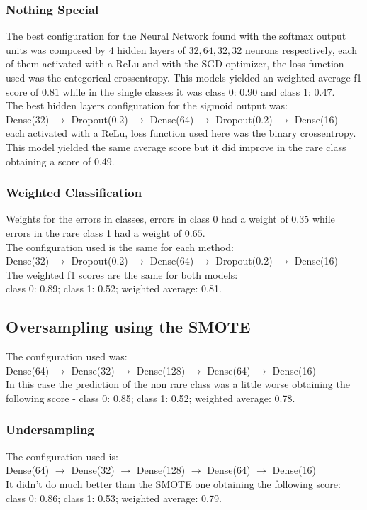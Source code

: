\documentclass[12pt, twocolumn]{article}
\begin{document}
\subsubsection*{Nothing Special}
The best configuration for the Neural Network found with the softmax output units was composed by 4 hidden layers of $32,64,32,32$ neurons respectively, each of them activated with a ReLu and with the SGD optimizer, the loss function used was the categorical crossentropy. This models yielded an weighted average f1 score of $0.81$ while in the single classes it was class 0: 0.90 and class 1: 0.47.\\
The best hidden layers configuration for the sigmoid output was: \\
Dense(32) $\to$ Dropout(0.2) $\to$ Dense(64) $\to$ Dropout(0.2) $\to$ Dense(16)\\
each activated with a ReLu, loss function used here was the binary crossentropy.
This model yielded the same average score but it did improve in the rare class obtaining a score of 0.49.
\vspace{-0.5cm}
\subsubsection*{Weighted Classification}
Weights for the errors in classes, errors in class 0 had a weight of $0.35$ while errors in the rare class 1 had a weight of $0.65$.\\
The configuration used is the same for each method:\\
Dense(32) $\to$ Dropout(0.2) $\to$ Dense(64) $\to$ Dropout(0.2) $\to$ Dense(16)\\
The weighted f1 scores are the same for both models:\\
class 0: 0.89; class 1: 0.52; weighted average: 0.81.
\vspace{-0.5cm}
\subsection*{Oversampling using the SMOTE}
The configuration used was:\\
Dense(64) $\to$ Dense(32) $\to$ Dense(128) $\to$ Dense(64) $\to$ Dense(16)\\
In this case the prediction of the non rare class was a little worse obtaining the following score - 
class 0: 0.85; class 1: 0.52; weighted average: 0.78.
\vspace{-0.5cm}
\subsubsection*{Undersampling}
The configuration used is:\\
Dense(64) $\to$ Dense(32) $\to$ Dense(128) $\to$ Dense(64) $\to$ Dense(16)\\
It didn't do much better than the SMOTE one obtaining the following score:\\
class 0: 0.86; class 1: 0.53; weighted average: 0.79.
\end{document}
